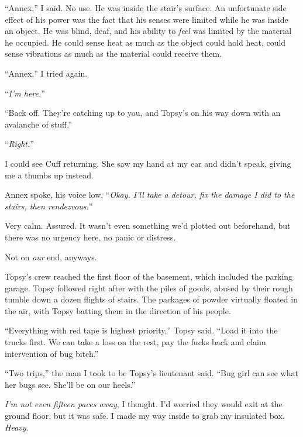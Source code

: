 ``Annex,'' I said.  No use.  He was inside the stair's surface.  An unfortunate side effect of his power was the fact that his senses were limited while he was inside an object.  He was blind, deaf, and his ability to \emph{feel} was limited by the material he occupied.  He could sense heat as much as the object could hold heat, could sense vibrations as much as the material could receive them.



``Annex,'' I tried again.



``\emph{I'm here.}''



``Back off.  They're catching up to you, and Topsy's on his way down with an avalanche of stuff.''



``\emph{Right.}''



I could see Cuff returning.  She saw my hand at my ear and didn't speak, giving me a thumbs up instead.



Annex spoke, his voice low, ``\emph{Okay.  I'll take a detour, fix the damage I did to the stairs, then rendezvous.}''



Very calm.  Assured.  It wasn't even something we'd plotted out beforehand, but there was no urgency here, no panic or distress.



Not on \emph{our} end, anyways.



Topsy's crew reached the first floor of the basement, which included the parking garage.  Topsy followed right after with the piles of goods, abused by their rough tumble down a dozen flights of stairs.  The packages of powder virtually floated in the air, with Topsy batting them in the direction of his people.



``Everything with red tape is highest priority,'' Topsy said.  ``Load it into the trucks first.  We can take a loss on the rest, pay the fucks back and claim intervention of bug bitch.''



``Two trips,'' the man I took to be Topsy's lieutenant said.  ``Bug girl can see what her bugs see.  She'll be on our heels.''



\emph{I'm not even fifteen paces away}, I thought.  I'd worried they would exit at the ground floor, but it was safe.  I made my way inside to grab my insulated box.  \emph{Heavy}.



